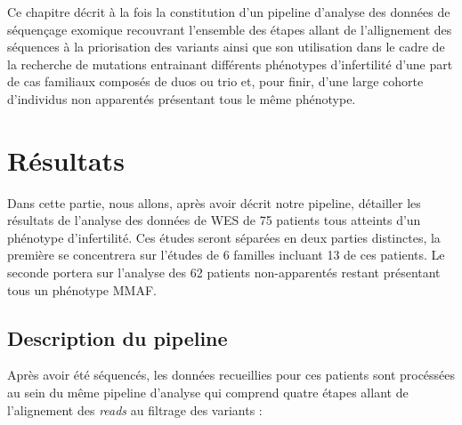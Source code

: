 \documentclass[12pt,twoside]{reedthesis}
\theoremstyle{definition}
\theoremstyle{definition}
\theoremstyle{remark}
\begin{document}
  Ce chapitre décrit à la fois la constitution d'un pipeline d'analyse des
  données de séquençage exomique recouvrant l'ensemble des étapes allant
  de l'allignement des séquences à la priorisation des variants ainsi que
  son utilisation dans le cadre de la recherche de mutations entrainant
  différents phénotypes d'infertilité d'une part de cas familiaux composés
  de duos ou trio et, pour finir, d'une large cohorte d'individus non
  apparentés présentant tous le même phénotype.
  
  \newpage
  
  \section{Résultats}\label{resultats}
  
  Dans cette partie, nous allons, après avoir décrit notre pipeline,
  détailler les résultats de l'analyse des données de WES de 75 patients
  tous atteints d'un phénotype d'infertilité. Ces études seront séparées
  en deux parties distinctes, la première se concentrera sur l'études de 6
  familles incluant 13 de ces patients. Le seconde portera sur l'analyse
  des 62 patients non-apparentés restant présentant tous un phénotype
  MMAF.
  
  \subsection{Description du pipeline}\label{description-du-pipeline}
  
  Après avoir été séquencés, les données recueillies pour ces patients
  sont procéssées au sein du même pipeline d'analyse qui comprend quatre
  étapes allant de l'alignement des \emph{reads} au filtrage des variants
  :
  
\end{document}
